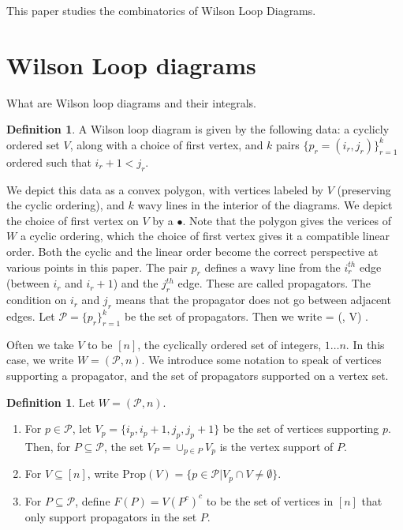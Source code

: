 \documentclass[11pt]{article}
\def\bas #1\eas{\begin{align*} #1 \end{align*}}
\newcommand{\cP}{\mathcal{P}}
\newcommand{\Prop}{\textrm{Prop}}
\theoremstyle{remark}
\theoremstyle{definition}
\newtheorem{dfn}[thm]{Definition}
\begin{document}
This paper studies the combinatorics of Wilson Loop Diagrams.
\section{Wilson Loop diagrams}

What are Wilson loop diagrams and their integrals.

\begin{dfn}\label{WLdfn}
A Wilson loop diagram is given by the following data: a cyclicly ordered set $V$, along with a choice of first vertex, and $k$ pairs $\{p_r = (i_r, j_r)\}_{r=1}^k$ ordered such that $i_r +1 < j_r$. \end{dfn}

We depict this data as a convex polygon, with vertices labeled by $V$ (preserving the cyclic ordering), and $k$ wavy lines in the interior of the diagrams. We depict the choice of first vertex on $V$ by a $\bullet$. Note that the polygon gives the verices of $W$ a cyclic ordering, which the choice of first vertex gives it a compatible linear order. Both the cyclic and the linear order become the correct perspective at various points in this paper. The pair $p_r$ defines a wavy line from the $i_r^{th}$ edge (between $i_r$ and $i_r+1$) and the $j_r^{th}$ edge. These are called propagators.  The condition on $i_r$ and $j_r$ means that the propagator does not go between adjacent edges. Let $\cP = \{p_r\}_{r=1}^k$ be the set of propagators. Then we write \bas W = (\cP, V) \;.\eas

Often we take $V$ to be $[n]$, the cyclically ordered set of integers, $1 \ldots n$. In this case, we write $W = (\cP, n)$. We introduce some notation to speak of vertices supporting a propagator, and the set of propagators supported on a vertex set.

\begin{dfn} \label{VPropdfn}
Let $W = (\cP, n)$.
\begin{enumerate}
\item For $p \in \cP$, let $V_p = \{i_p, i_p+1, j_p, j_p+1\}$ be the set of vertices supporting $p$. Then, for $P \subseteq \cP$, the set $V_P = \cup_{p \in P} V_p$ is the vertex support of $P$.
\item For $V \subseteq [n]$, write $\Prop(V) = \{ p \in \cP | V_p \cap V \neq \emptyset \} $.
\item For $P \subseteq \cP$, define $F(P) = V(P^c)^c$ to be the set of vertices in $[n]$ that only support propagators in the set $P$.
\end{enumerate}
\end{dfn}
\end{document}
